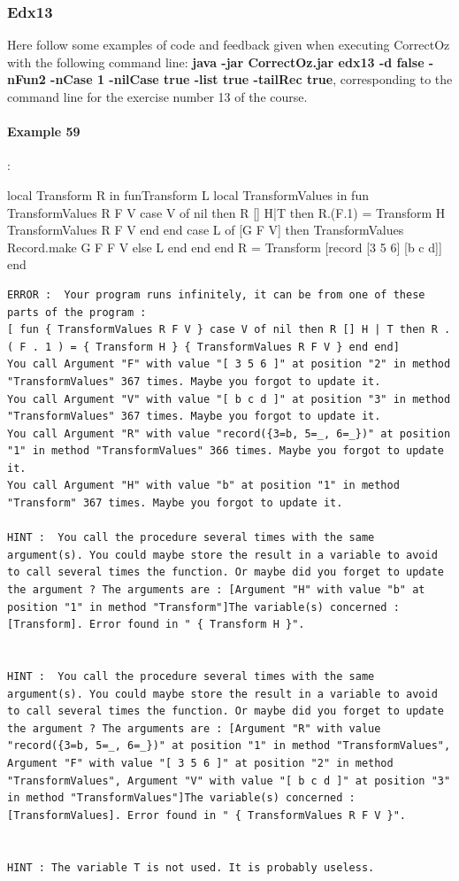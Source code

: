 \documentclass[11pt,a4paper,twoside,openright]{report}
\begin{document}
\subsubsection{Edx13}
Here follow some examples of code and feedback given when executing 
CorrectOz with the following command line: \textbf{java -jar CorrectOz.jar edx13 -d 
false -nFun2 -nCase 1 -nilCase true -list true -tailRec true}, corresponding 
to the command line for the exercise number 13 of the course.

\paragraph{Example 59}:

\begin{OZ}
local Transform R in 
	fun{Transform L}
		local TransformValues in
			fun {TransformValues R F V}
					case V of nil then R
					[] H|T then
					    R.(F.1) = {Transform H}  
					    {TransformValues R F V}
					end
			end
			case L of [G F V] then {TransformValues {Record.make G 
F} F V}
			else L
			end
		end
	end
R = {Transform [record [3 5 6] [b c d]]}
end
\end{OZ}

\begin{lstlisting}
ERROR :  Your program runs infinitely, it can be from one of these parts of the program : 
[ fun { TransformValues R F V } case V of nil then R [] H | T then R . ( F . 1 ) = { Transform H } { TransformValues R F V } end end]
You call Argument "F" with value "[ 3 5 6 ]" at position "2" in method "TransformValues" 367 times. Maybe you forgot to update it.
You call Argument "V" with value "[ b c d ]" at position "3" in method "TransformValues" 367 times. Maybe you forgot to update it.
You call Argument "R" with value "record({3=b, 5=_, 6=_})" at position "1" in method "TransformValues" 366 times. Maybe you forgot to update it.
You call Argument "H" with value "b" at position "1" in method "Transform" 367 times. Maybe you forgot to update it.

HINT :  You call the procedure several times with the same argument(s). You could maybe store the result in a variable to avoid to call several times the function. Or maybe did you forget to update the argument ? The arguments are : [Argument "H" with value "b" at position "1" in method "Transform"]The variable(s) concerned :[Transform]. Error found in " { Transform H }".


HINT :  You call the procedure several times with the same argument(s). You could maybe store the result in a variable to avoid to call several times the function. Or maybe did you forget to update the argument ? The arguments are : [Argument "R" with value "record({3=b, 5=_, 6=_})" at position "1" in method "TransformValues", Argument "F" with value "[ 3 5 6 ]" at position "2" in method "TransformValues", Argument "V" with value "[ b c d ]" at position "3" in method "TransformValues"]The variable(s) concerned :[TransformValues]. Error found in " { TransformValues R F V }".


HINT : The variable T is not used. It is probably useless.

\end{lstlisting}
\end{document}
